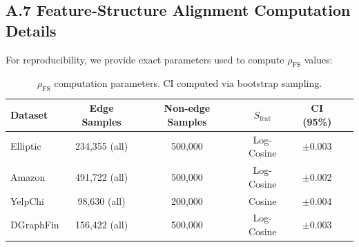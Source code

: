 \subsection*{A.7 Feature-Structure Alignment Computation Details}

For reproducibility, we provide exact parameters used to compute $\rho_{\text{FS}}$ values:

\begin{table}[h]
\centering
\small
\begin{tabular}{lccccc}
\toprule
\textbf{Dataset} & \textbf{Edge Samples} & \textbf{Non-edge Samples} & $S_{\text{feat}}$ & \textbf{CI (95\%)} \\
\midrule
Elliptic & 234,355 (all) & 500,000 & Log-Cosine & $\pm$0.003 \\
Amazon & 491,722 (all) & 500,000 & Log-Cosine & $\pm$0.002 \\
YelpChi & 98,630 (all) & 200,000 & Cosine & $\pm$0.004 \\
DGraphFin & 156,422 (all) & 500,000 & Log-Cosine & $\pm$0.003 \\
\bottomrule
\end{tabular}
\caption{$\rho_{\text{FS}}$ computation parameters. CI computed via bootstrap sampling.}
\end{table}
